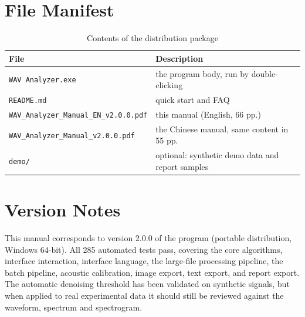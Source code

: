 \documentclass[UTF8,a4paper,12pt]{ctexart}
\begin{document}
\section{File Manifest}

\begin{table}[htbp]
\centering
\caption{Contents of the distribution package}
\begin{tabular}{@{}>{\raggedright\arraybackslash}p{6.0cm}>{\raggedright\arraybackslash}p{8.5cm}@{}}
\toprule
File & Description \\
\midrule
\texttt{WAV Analyzer.exe} & the program body, run by double-clicking \\
\texttt{README.md} & quick start and FAQ \\
\nolinkurl{WAV_Analyzer_Manual_EN_v2.0.0.pdf} & this manual (English, 66 pp.) \\
\nolinkurl{WAV_Analyzer_Manual_v2.0.0.pdf} & the Chinese manual, same content in 55 pp. \\
\texttt{demo/} & optional: synthetic demo data and report samples \\
\bottomrule
\end{tabular}
\end{table}

\section{Version Notes}

This manual corresponds to version 2.0.0 of the program (portable distribution, Windows 64-bit). All 285 automated tests pass, covering the core algorithms, interface interaction, interface language, the large-file processing pipeline, the batch pipeline, acoustic calibration, image export, text export, and report export. The automatic denoising threshold has been validated on synthetic signals, but when applied to real experimental data it should still be reviewed against the waveform, spectrum and spectrogram.
\end{document}
